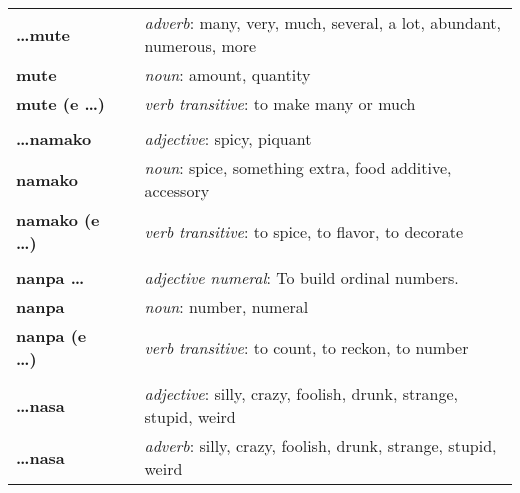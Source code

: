 \begin{supertabular}{p{2,5cm}|ll}
    \textbf{\dots mute}          &  & \textit{adverb}: many, very, much, several, a lot, abundant, numerous, more                                \\
    \textbf{mute}                &  & \textit{noun}: amount, quantity                                                                            \\
    \textbf{mute (e \dots)}      &  & \textit{verb transitive}: to make many or much                                                             \\
                                 &  &                                                                                                            \\ %
    \textbf{\dots namako}        &  & \textit{adjective}: spicy, piquant                                                                         \\
    \textbf{namako}              &  & \textit{noun}: spice, something extra, food additive, accessory                                            \\
    \textbf{namako (e \dots)}    &  & \textit{verb transitive}: to spice, to flavor, to decorate                                                 \\
                                 &  &                                                                                                            \\ %
    \textbf{nanpa \dots}         &  & \textit{adjective numeral}: To build ordinal numbers.                                                      \\
    \textbf{nanpa}               &  & \textit{noun}: number, numeral                                                                             \\
    \textbf{nanpa (e \dots)}     &  & \textit{verb transitive}: to count, to reckon,  to number                                                  \\
                                 &  &                                                                                                            \\ %
    \textbf{\dots nasa}          &  & \textit{adjective}: silly, crazy, foolish, drunk, strange, stupid, weird                                   \\
    \textbf{\dots nasa}          &  & \textit{adverb}: silly, crazy, foolish, drunk, strange, stupid, weird                                      \\

\end{supertabular}
